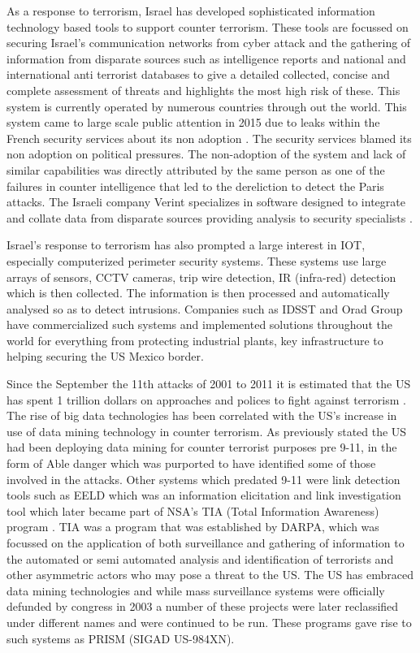 As a response to terrorism, Israel has developed sophisticated information technology based tools to support counter terrorism. These tools are focussed on securing Israel's communication networks from cyber attack and the gathering of information from disparate sources such as intelligence reports and national and international anti terrorist databases to give a detailed collected, concise and complete assessment of threats and highlights the most high risk of these. This system is currently operated by numerous countries through out the world. This system came to large scale public attention in 2015 due to leaks within the French security services about its non adoption \citep{Israelcounterterrorismlessonfrance}. 
The security services blamed its non adoption on political pressures. The non-adoption of the system and lack of similar capabilities was directly attributed by the same person as one of the failures in counter intelligence that led to the dereliction to detect the Paris attacks. The Israeli company Verint specializes in software designed to integrate and collate data from disparate sources  providing analysis to security specialists \citep{zureik2010surveillance}.

Israel's response to terrorism has also prompted a large interest in IOT, especially  computerized perimeter security systems. These systems use large arrays of sensors, CCTV cameras, trip wire detection, IR (infra-red) detection which is then collected. The information is then processed and automatically analysed so as to detect intrusions. Companies such as IDSST and Orad Group \citep{gordon2011israel} have commercialized such systems and implemented solutions throughout the world for everything from  protecting industrial plants, key infrastructure to helping securing the US Mexico border.

Since the September the 11th attacks of 2001 to 2011 it is estimated that the US has  spent 1 trillion dollars on approaches and polices to fight against terrorism \citep{roche2015intelligence}. The rise of big data technologies has been correlated with the US's increase in use of data mining technology in counter terrorism. As previously stated the US had been deploying data mining for counter terrorist purposes pre 9-11, in the form of Able danger which was purported to have identified some of those involved  in the attacks. Other systems which predated 9-11 were link detection tools such as EELD \citep{mooney2002relational} which was an information  elicitation and link investigation tool which later became part of NSA's TIA (Total Information Awareness) program \citep{deibel2016nsa}. TIA was a program that was established by DARPA, which was focussed on the application of both surveillance and gathering of information to the automated or semi automated analysis and identification of terrorists and other asymmetric actors who may pose a threat to the US. The US has embraced data mining technologies and while mass surveillance systems were officially defunded by congress in 2003 a number of these projects were later reclassified under different names and were continued to be run. These programs gave rise to such systems as PRISM (SIGAD US-984XN). 

